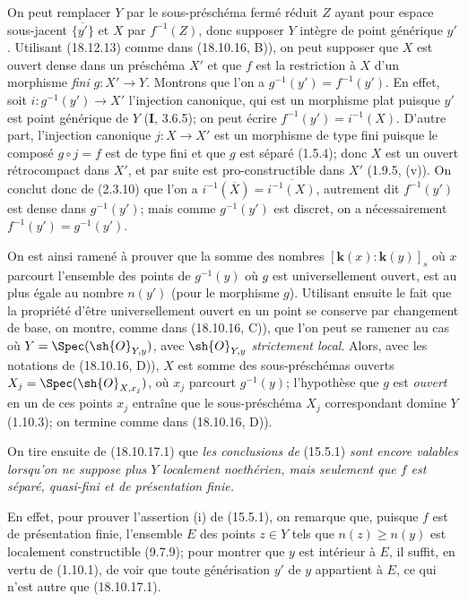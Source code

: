 On peut remplacer $Y$ par le sous-préschéma fermé réduit $Z$ ayant pour espace sous-jacent $\overline{\{y'\}}$ et $X$ par $f^{-1}(Z)$, donc supposer $Y$ intègre de point générique $y'$. Utilisant (18.12.13) comme dans (18.10.16, B)), on peut supposer que $X$ est ouvert dense dans un préschéma $X'$ et que $f$ est la restriction à $X$ d'un morphisme \emph{fini} $g:X'\to Y$. Montrons que l'on a $g^{-1}(y')=f^{-1}(y')$. En effet, soit $i:g^{-1}(y')\to X'$ l'injection canonique, qui est un morphisme plat puisque $y'$ est point générique de $Y$ (\textbf{I}, 3.6.5); on peut écrire $f^{-1}(y')=i^{-1}(X)$. D'autre part, l'injection canonique $j:X\to X'$ est un morphisme de type fini puisque le composé $g\circ j=f$ est de type fini et que $g$ est séparé (1.5.4); donc $X$ est un ouvert rétrocompact dans $X'$, et par suite est pro-constructible dans $X'$ (1.9.5, (v)). On conclut donc de (2.3.10) que l'on a $i^{-1}(\overline{X})=\overline{i^{-1}(X)}$, autrement dit $f^{-1}(y')$ est dense dans $g^{-1}(y')$; mais comme $g^{-1}(y')$ est discret, on a nécessairement $f^{-1}(y')=g^{-1}(y')$.

On est ainsi ramené à prouver que la somme des nombres $[\boldsymbol{k}(x):\boldsymbol{k}(y)]_s$ où $x$ parcourt l'ensemble des points de $g^{-1}(y)$ où $g$ est universellement ouvert, est au plus égale
au nombre $n(y')$ (pour le morphisme $g$). Utilisant ensuite le fait que la propriété d'être universellement ouvert en un point se conserve par changement de base, on montre, comme dans (18.10.16, C)), que l'on peut se ramener au cas où $Y=\Spec(\sh{O}_{Y,y})$, avec $\sh{O}_{Y,y}$ \emph{strictement local}. Alors, avec les notations de (18.10.16, D)), $X$ est somme des sous-préschémas ouverts $X_j=\Spec(\sh{O}_{X,x_j})$, où $x_j$ parcourt $g^{-1}(y)$; l'hypothèse que $g$ est \emph{ouvert} en un de ces points $x_j$ entraîne que le sous-préschéma $X_j$ correspondant domine $Y$ (1.10.3); on termine comme dans (18.10.16, D)).

On tire ensuite de (18.10.17.1) que \emph{les conclusions de} (15.5.1) \emph{sont encore valables lorsqu'on ne suppose plus $Y$ localement noethérien, mais seulement que $f$ est séparé, quasi-fini et de présentation finie.}

En effet, pour prouver l'assertion (i) de (15.5.1), on remarque que, puisque $f$ est de présentation finie, l'ensemble $E$ des points $z\in Y$ tels que $n(z)\geq n(y)$ est localement constructible (9.7.9); pour montrer que $y$ est intérieur à $E$, il suffit, en vertu de (1.10.1), de voir que toute générisation $y'$ de $y$ appartient à $E$, ce qui n'est autre que (18.10.17.1).

